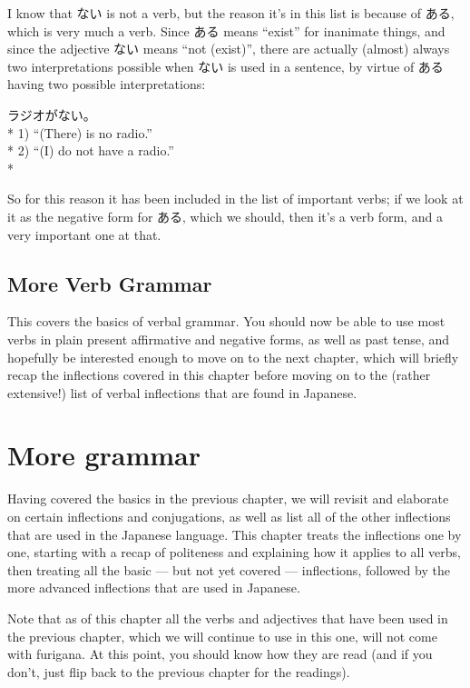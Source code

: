 \documentclass[11pt, b5paper, twoside, openright, onecolumn]{book}
\newenvironment{exampleblock}{
\setlength{\parindent}{0.6in}
\begin{minipage}[t]{\dimexpr\textwidth-\parindent}}
{\end{minipage}}
\begin{document}
I know that ない is not a verb‚ but the reason it’s in this list is because of ある‚ which is very much a verb. Since ある means “exist” for inanimate things‚ and since the adjective ない means “not (exist)”‚ there are actually (almost) always two interpretations possible when ない is used in a sentence‚ by virtue of ある having two possible interpretations:

\vspace{0.4cm}
\begin{exampleblock}
ラジオがない。 \\* 
1) “(There) is no radio.” \\* 
2) “(I) do not have a radio.” \\* 
\end{exampleblock}
\vspace{0.2cm}

So for this reason it has been included in the list of important verbs; if we look at it as the negative form for ある‚ which we should‚ then it’s a verb form‚ and a very important one at that.

\section{More Verb Grammar}

This covers the basics of verbal grammar. You should now be able to use most verbs in plain present affirmative and negative forms‚ as well as past tense‚ and hopefully be interested enough to move on to the next chapter‚ which will briefly recap the inflections covered in this chapter before moving on to the (rather extensive!) list of verbal inflections that are found in Japanese.


\chapter{More grammar}

Having covered the basics in the previous chapter‚ we will revisit and elaborate on certain inflections and conjugations‚ as well as list all of the other inflections that are used in the Japanese language. This chapter treats the inflections one by one‚ starting with a recap of politeness and explaining how it applies to all verbs‚ then treating all the basic — but not yet covered — inflections‚ followed by the more advanced inflections that are used in Japanese.

Note that as of this chapter all the verbs and adjectives that have been used in the previous chapter‚ which we will continue to use in this one‚ will not come with furigana. At this point‚ you should know how they are read (and if you don’t‚ just flip back to the previous chapter for the readings).
\end{document}
